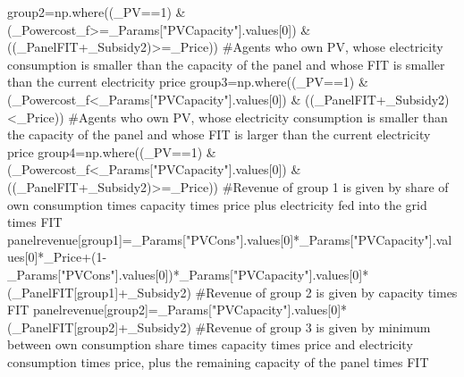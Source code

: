 \documentclass[
  letterpaper,
  DIV=11,
  numbers=noendperiod]{scrartcl}
\newenvironment{Shaded}{\begin{snugshade}}{\end{snugshade}}
\newcommand{\CommentTok}[1]{\textcolor[rgb]{0.37,0.37,0.37}{#1}}
\newcommand{\DecValTok}[1]{\textcolor[rgb]{0.68,0.00,0.00}{#1}}
\newcommand{\NormalTok}[1]{\textcolor[rgb]{0.00,0.23,0.31}{#1}}
\newcommand{\OperatorTok}[1]{\textcolor[rgb]{0.37,0.37,0.37}{#1}}
\newcommand{\StringTok}[1]{\textcolor[rgb]{0.13,0.47,0.30}{#1}}
\begin{document}
\begin{Shaded}
\begin{Highlighting}[]
\NormalTok{    group2}\OperatorTok{=}\NormalTok{np.where((\_PV}\OperatorTok{==}\DecValTok{1}\NormalTok{) }\OperatorTok{\&}\NormalTok{ (\_Powercost\_f}\OperatorTok{\textgreater{}=}\NormalTok{\_Params[}\StringTok{"PVCapacity"}\NormalTok{].values[}\DecValTok{0}\NormalTok{]) }\OperatorTok{\&}\NormalTok{ ((\_PanelFIT}\OperatorTok{+}\NormalTok{\_Subsidy2)}\OperatorTok{\textgreater{}=}\NormalTok{\_Price))}
    \CommentTok{\#Agents who own PV, whose electricity consumption is smaller than the capacity of the panel and whose FIT is smaller than the current electricity price}
\NormalTok{    group3}\OperatorTok{=}\NormalTok{np.where((\_PV}\OperatorTok{==}\DecValTok{1}\NormalTok{) }\OperatorTok{\&}\NormalTok{ (\_Powercost\_f}\OperatorTok{\textless{}}\NormalTok{\_Params[}\StringTok{"PVCapacity"}\NormalTok{].values[}\DecValTok{0}\NormalTok{]) }\OperatorTok{\&}\NormalTok{ ((\_PanelFIT}\OperatorTok{+}\NormalTok{\_Subsidy2)}\OperatorTok{\textless{}}\NormalTok{\_Price))}
    \CommentTok{\#Agents who own PV, whose electricity consumption is smaller than the capacity of the panel and whose FIT is larger than the current electricity price}
\NormalTok{    group4}\OperatorTok{=}\NormalTok{np.where((\_PV}\OperatorTok{==}\DecValTok{1}\NormalTok{) }\OperatorTok{\&}\NormalTok{ (\_Powercost\_f}\OperatorTok{\textless{}}\NormalTok{\_Params[}\StringTok{"PVCapacity"}\NormalTok{].values[}\DecValTok{0}\NormalTok{]) }\OperatorTok{\&}\NormalTok{ ((\_PanelFIT}\OperatorTok{+}\NormalTok{\_Subsidy2)}\OperatorTok{\textgreater{}=}\NormalTok{\_Price))}
    \CommentTok{\#Revenue of group 1 is given by share of own consumption times capacity times price plus electricity fed into the grid times FIT}
\NormalTok{    panelrevenue[group1]}\OperatorTok{=}\NormalTok{\_Params[}\StringTok{"PVCons"}\NormalTok{].values[}\DecValTok{0}\NormalTok{]}\OperatorTok{*}\NormalTok{\_Params[}\StringTok{"PVCapacity"}\NormalTok{].values[}\DecValTok{0}\NormalTok{]}\OperatorTok{*}\NormalTok{\_Price}\OperatorTok{+}\NormalTok{(}\DecValTok{1}\OperatorTok{{-}}\NormalTok{\_Params[}\StringTok{"PVCons"}\NormalTok{].values[}\DecValTok{0}\NormalTok{])}\OperatorTok{*}\NormalTok{\_Params[}\StringTok{"PVCapacity"}\NormalTok{].values[}\DecValTok{0}\NormalTok{]}\OperatorTok{*}\NormalTok{(\_PanelFIT[group1]}\OperatorTok{+}\NormalTok{\_Subsidy2)}
    \CommentTok{\#Revenue of group 2 is given by capacity times FIT}
\NormalTok{    panelrevenue[group2]}\OperatorTok{=}\NormalTok{\_Params[}\StringTok{"PVCapacity"}\NormalTok{].values[}\DecValTok{0}\NormalTok{]}\OperatorTok{*}\NormalTok{(\_PanelFIT[group2]}\OperatorTok{+}\NormalTok{\_Subsidy2)}
    \CommentTok{\#Revenue of group 3 is given by minimum between own consumption share times capacity times price and electricity consumption times price, plus the remaining capacity of the panel times FIT}

\end{Highlighting}
\end{Shaded}
\end{document}
